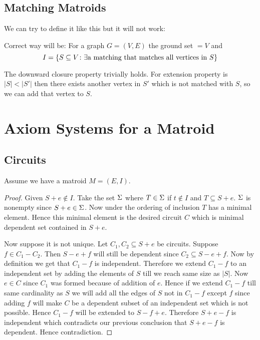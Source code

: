 \subsection{Matching Matroids}
We can try to define it like this but it will not work:
\parinf

Correct way will be: For a graph $G=(V,E)$ the ground set $=V$ and $$I=\{S\subseteq V\colon \exists \text{a matching that matches all vertices in $S$}\}$$\parinn

The downward closure property trivially holds. For extension property is $|S|<|S'|$ then there exists another vertex in $S'$ which is not matched with $S$, so we can add that vertex to $S$. 


\section{Axiom Systems for a Matroid}

\subsection{Circuits}
Assume we have a matroid $M=(E,I)$. 
\begin{proof}
	Given $S+e\notin I$. Take the set $\Sigma$ where $T\in \Sigma$ if $t\notin I$ and $T\subseteq S+e$. $\Sigma$ is nonempty since $S+e\in \Sigma$. Now under the ordering of inclusion $T$ has a minimal element. Hence this minimal element is the desired circuit $C$ which is minimal dependent set contained in $S+e$.
	
	Now suppose it is not unique. Let $C_1,C_2\subseteq S+e$ be circuits. Suppose $f\in C_1-C_2$. Then $S-e+f$ will still be dependent since $C_2\subseteq S-e+f$. Now by definition we get that $C_1-f$ is independent. Therefore we extend $C_1-f$ to an independent set by adding the elements of $S$ till we reach same size as $|S|$. Now $e\in C$ since $C_1$ was formed because of addition of $e$. Hence if we extend $C_1-f$ till same cardinality as $S$ we will add all the edges of $S$ not in $C_1-f$ except $f$ since adding $f$ will make $C$ be a dependent subset of an independent set which is not possible. Hence $C_1-f$ will be extended to $S-f+e$. Therefore $S+e-f$ is independent which contradicts our previous conclusion that $S+e-f$ is dependent. Hence contradiction.
\end{proof}